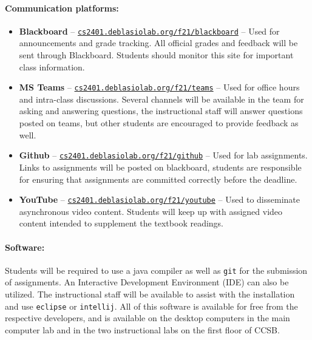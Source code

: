 \documentclass[12pt]{scrartcl}
\begin{document}
\paragraph{Communication platforms:}
\begin{itemize}
\item \textbf{Blackboard} -- \href{http://cs2401.deblasiolab.org/f21/blackboard}{\texttt{cs2401.deblasiolab.org/f21/blackboard}}  -- Used for announcements and grade tracking. All official grades and feedback will be sent through Blackboard. Students should monitor this site for important class information. 
\item \textbf{MS Teams} -- \href{http://cs2401.deblasiolab.org/f21/teams}{\texttt{cs2401.deblasiolab.org/f21/teams}}  -- Used for office hours and intra-class discussions. Several channels will be available in the team for asking and answering questions, the instructional staff will answer questions posted on teams, but other students are encouraged to provide feedback as well. 
\item \textbf{Github} -- \href{http://cs2401.deblasiolab.org/f21/github}{\texttt{cs2401.deblasiolab.org/f21/github}}  -- Used for lab assignments. Links to assignments will be posted on blackboard, students are responsible for ensuring that assignments are committed correctly before the deadline. 
\item \textbf{YouTube} -- \href{http://cs2401.deblasiolab.org/f21/youtube}{\texttt{cs2401.deblasiolab.org/f21/youtube}} -- Used to disseminate asynchronous video content. Students will keep up with assigned video content intended to supplement the textbook readings.
\end{itemize}

\paragraph{Software: } 
Students will be required to use a java compiler 
as well as \texttt{git} for the submission of assignments. 
An Interactive Development Environment (IDE) can also be utilized. The instructional staff will be available to assist with the installation and use \texttt{eclipse} or \texttt{intellij}. %
All of this software is available for free from the respective developers, and is available on the desktop computers in the main computer lab and in the two instructional labs on the first floor of CCSB. 

\end{document}
